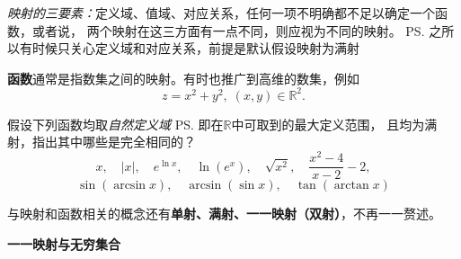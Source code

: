 {\it 映射的三要素：}定义域、值域、对应关系，任何一项不明确都不足以确定一个函数，或者说，
两个映射在这三方面有一点不同，则应视为不同的映射。
\ps{之所以有时候只关心定义域和对应关系，前提是默认假设映射为满射}

{\bf 函数}通常是指数集之间的映射。有时也推广到高维的数集，例如
$$z=x^2+y^2,\;(x,y)\in\mathbb{R}^2.$$

\egz 假设下列函数均取{\it 自然定义域}
\ps{即在$\mathbb{R}$中可取到的最大定义范围}，
且均为满射，指出其中哪些是完全相同的？
$$x,\quad |x|,\quad e^{\ln x},\quad \ln(e^x),\quad \sqrt{x^2},\quad
\frac{x^2-4}{x-2}-2,$$
$$\sin(\arcsin x),\quad \arcsin(\sin x), \quad \tan(\arctan x)$$

与映射和函数相关的概念还有{\bf 单射、满射、一一映射（双射）}，不再一一赘述。

\begin{shaded}
	{\bf 一一映射与无穷集合}


\end{shaded}
